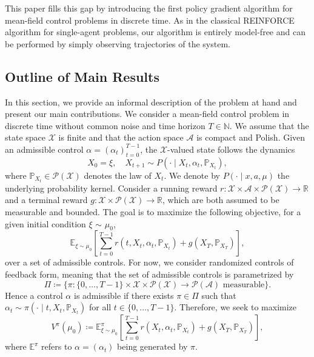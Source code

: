 \documentclass[11pt]{article}
\numberwithin{equation}{section}
\theoremstyle{definition}
\theoremstyle{remark}
\def\cA{\mathcal{A}}
\def\cX{\mathcal{X}}
\def\N{{\mathbb{N}}}
\def\R{{\mathbb R}}
\begin{document}
This paper fills this gap by introducing the first policy gradient algorithm for mean-field control problems in discrete time. As in the classical REINFORCE algorithm for single-agent problems, our algorithm is entirely model-free and can be performed by simply observing trajectories of the system.

\subsection{Outline of Main Results}

In this section, we provide an informal description of the problem at hand and present our main contributions.
We consider a mean-field control problem in discrete time without common noise and time horizon $T \in \N$. We assume that the state space $\cX$ is finite and that the action space $\cA$ is compact and Polish.
Given an admissible control $\alpha = (\alpha_t)_{t = 0}^{T-1}$, the $\cX$-valued state follows the dynamics 
\[
X_0 = \xi, \quad X_{t + 1} \sim P( \cdot \mid X_t, \alpha_t, \mathbb P_{X_t}),
\]
where $\mathbb P_{X_t} \in \mathcal P (\mathcal X)$ denotes the law of $X_t$. We denote by $P(\cdot \mid x,a,\mu)$ the underlying probability kernel. Consider a running reward $r: \mathcal X \times \mathcal A \times \mathcal P (\mathcal X) \rightarrow \R$ and a terminal reward $g: \mathcal X \times \mathcal P (\mathcal X) \rightarrow \R$, which are both assumed to be measurable and bounded.
The goal is to maximize the following objective, for a given initial condition $\xi$ $\sim$ $\mu_0$, 
\[
\mathbb E_{\xi \sim \mu_0} \left[\sum_{t = 0}^{T-1} r(t,X_t, \alpha_t, \mathbb P_{X_t}) + g(X_T, \mathbb P_{X_T})\right],
\]
over a set of admissible controls. For now, we consider randomized controls of feedback form, meaning that the set of admissible controls is parametrized by 
\[
\Pi \coloneq \{ \pi: \{0,\ldots,T-1\} \times \cX \times \mathcal P (\mathcal X) \rightarrow \mathcal P (\mathcal A) \text{ measurable} \}.
\]
Hence a control $\alpha$ is admissible if there exists $\pi \in \Pi$ such that $\alpha_t \sim \pi (\cdot \mid t,X_t, \mathbb P_{X_t})$ for all $t \in \{0, \ldots, T-1\}$.
Therefore, we seek to maximize
\begin{equation}
\label{eq:value-function}
V^\pi (\mu_0) \coloneq \mathbb E^{\pi}_{\xi \sim \mu_0} \left[ \sum_{t = 0}^{T - 1} r(X_t, \alpha_t, \mathbb P_{X_t}) + g(X_T, \mathbb P _{X_T})\right],
\end{equation}
where $\mathbb E^{\pi}$ refers to $\alpha = (\alpha_t)$ being generated by $\pi$.
\end{document}
